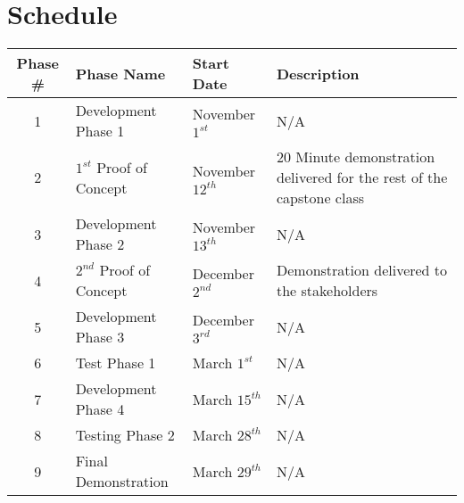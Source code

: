 \documentclass[paper=letter, fontsize=10pt]{scrartcl}
\numberwithin{equation}{section}		%
\numberwithin{figure}{section}			%
\numberwithin{table}{section}				%
\begin{document}
\section{Schedule}
\begin{center}
    \begin{tabular}{| c | l | l | p{5cm} |}
    \hline
    Phase \# & Phase Name & Start Date & Description \\ \hline
    1 & Development Phase 1 & November $1^{st}$ & N/A \\ \hline
    2 & $1^{st}$ Proof of Concept & November $12^{th}$ & 20 Minute demonstration delivered for the rest of the capstone class \\ \hline
    3 & Development Phase 2 & November $13^{th}$ & N/A \\ \hline
    4 & $2^{nd}$ Proof of Concept & December $2^{nd}$ & Demonstration delivered to the stakeholders \\ \hline
    5 & Development Phase 3 & December $3^{rd}$ & N/A \\ \hline
    6 & Test Phase 1 & March $1^{st}$ & N/A \\ \hline
    7 & Development Phase 4 & March $15^{th}$ & N/A \\ \hline
    8 & Testing Phase 2 & March $28^{th}$ & N/A \\ \hline
    9 & Final Demonstration & March $29^{th}$ & N/A \\ \hline
  	
    \end{tabular}
\end{center}


\end{document}
